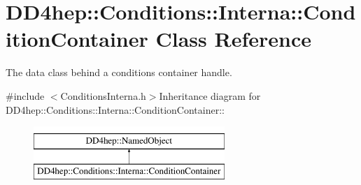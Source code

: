 \hypertarget{class_d_d4hep_1_1_conditions_1_1_interna_1_1_condition_container}{
\section{DD4hep::Conditions::Interna::ConditionContainer Class Reference}
\label{class_d_d4hep_1_1_conditions_1_1_interna_1_1_condition_container}
}


The data class behind a conditions container handle.  


{\ttfamily \#include $<$ConditionsInterna.h$>$}Inheritance diagram for DD4hep::Conditions::Interna::ConditionContainer::\begin{figure}[H]
\begin{center}
\leavevmode
\includegraphics[height=2cm]{class_d_d4hep_1_1_conditions_1_1_interna_1_1_condition_container}
\end{center}
\end{figure}
